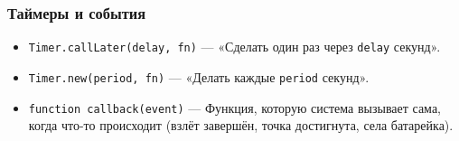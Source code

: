 \subsubsection{Таймеры и события}
\begin{itemize}
   \item \texttt{Timer.callLater(delay, fn)} — «Сделать один раз через \texttt{delay} секунд».
   \item \texttt{Timer.new(period, fn)} — «Делать каждые \texttt{period} секунд».
   \item \texttt{function callback(event)} — Функция, которую система вызывает сама, когда что-то происходит (взлёт завершён, точка достигнута, села батарейка).
\end{itemize}
